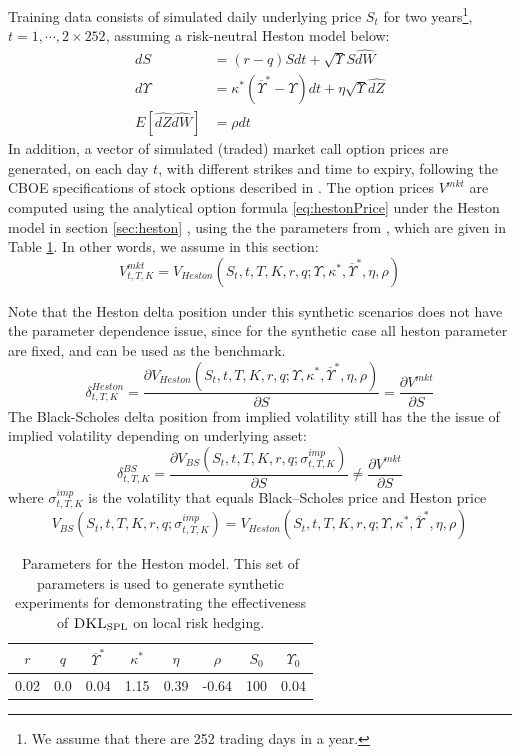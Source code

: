 \documentclass[letterpaper,12pt,titlepage,oneside,final]{book}
\numberwithin{equation}{section}
\theoremstyle{definition}
\newcommand{\Vmkt}{V^{mkt}}
\newcommand{\DKLs}{\bf\textsc{DKL}_{\text{SPL}}}
\begin{document}
Training data consists of simulated daily underlying price $S_t$ for two years\footnote{We assume that there are 252 trading days in a year.}, $t=1,\cdots, 2\times 252$, assuming a  risk-neutral Heston model below:
\[
	\begin{split}
	dS&=(r-q) S dt + \sqrt{\Upsilon} S \hat{dW}\\
	d\Upsilon&=\kappa^*(\overline{\Upsilon}^*-\Upsilon)dt+\eta \sqrt{\Upsilon}\hat{dZ}\\
	E[\hat{dZ}\hat{dW}]&=\rho dt
	\end{split}
\]
In addition,  a vector of simulated (traded)  market call option prices  are  generated,  on each day $t$, with different strikes and time to expiry, following  the CBOE specifications of stock options described in  \cite{hull2006options}.
 The option prices $\Vmkt$ are  computed using  the analytical option 
 formula \eqref{eq:hestonPrice} under the Heston model \citep{heston1993closed} in section \ref{sec:heston} ,
 using the the parameters  from \citep{bakshi1997empirical}, which are given in Table \ref{para}. In other words, we assume in this section:
 \[
\Vmkt_{t,T,K}=V_{Heston}(S_t,t,T,K,r,q;\Upsilon,\kappa^*,\overline{\Upsilon}^*,\eta,\rho)
 \]

Note that the Heston delta position under this synthetic scenarios does not have the parameter dependence issue, since for the synthetic case all heston parameter are fixed, and can be used as the benchmark.
 \[
	 \delta^{Heston}_{t,T,K}=\frac{ \partial V_{Heston}(S_t,t,T,K,r,q;\Upsilon,\kappa^*,\overline{\Upsilon}^*,\eta,\rho)}{\partial S}=\frac{\partial \Vmkt}{\partial S}
 \] 
 The Black-Scholes delta position from implied volatility still has the the issue of implied volatility depending on underlying asset:
 \[
	 \delta^{BS}_{t,T,K}=\frac{ \partial V_{BS}(S_t,t,T,K,r,q;\sigma^{imp}_{t,T,K})}{\partial S} \neq \frac{\partial \Vmkt}{\partial S}
 \] 
 where $\sigma^{imp}_{t,T,K}$ is the volatility that equals Black–Scholes price and Heston price
 \[
	 V_{BS}(S_t,t,T,K,r,q;\sigma^{imp}_{t,T,K})=V_{Heston}(S_t,t,T,K,r,q;\Upsilon,\kappa^*,\overline{\Upsilon}^*,\eta,\rho)
 \]

 \begin{table}[htp!]
\begin{center}
\begin{tabular}{|c|c|c|c|c|c|c|c|}
\hline
 $r$ &$q$& $\overline{\Upsilon}^*$  & $\kappa^*$ & $\eta$ & $\rho$ & $S_0$ & $\Upsilon_0$  \\ \hline
 0.02&0.0&0.04                  & 1.15   & 0.39  & -0.64 & 100 &0.04 \\    \hline
\end{tabular}
\end{center}

\caption{Parameters for the Heston model. This set of parameters is used to generate synthetic experiments for demonstrating the effectiveness of $\DKLs$ on local risk hedging.}
\label{para}
\end{table}
\end{document}
